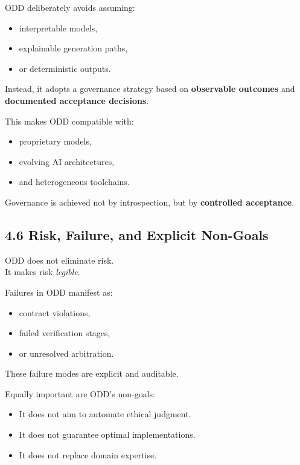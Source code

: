 \documentclass[
]{article}
\begin{document}
ODD deliberately avoids assuming:

\begin{itemize}
\item
  interpretable models,
\item
  explainable generation paths,
\item
  or deterministic outputs.
\end{itemize}

Instead, it adopts a governance strategy based on \textbf{observable
outcomes} and \textbf{documented acceptance decisions}.

This makes ODD compatible with:

\begin{itemize}
\item
  proprietary models,
\item
  evolving AI architectures,
\item
  and heterogeneous toolchains.
\end{itemize}

Governance is achieved not by introspection, but by \textbf{controlled
acceptance}.

\hypertarget{46-risk-failure-and-explicit-non-goals}{%
\subsection{4.6 Risk, Failure, and Explicit
Non-Goals}\label{46-risk-failure-and-explicit-non-goals}}

ODD does not eliminate risk.\\
It makes risk \emph{legible}.

Failures in ODD manifest as:

\begin{itemize}
\item
  contract violations,
\item
  failed verification stages,
\item
  or unresolved arbitration.
\end{itemize}

These failure modes are explicit and auditable.

Equally important are ODD's non-goals:

\begin{itemize}
\item
  It does not aim to automate ethical judgment.
\item
  It does not guarantee optimal implementations.
\item
  It does not replace domain expertise.
\end{itemize}
\end{document}
